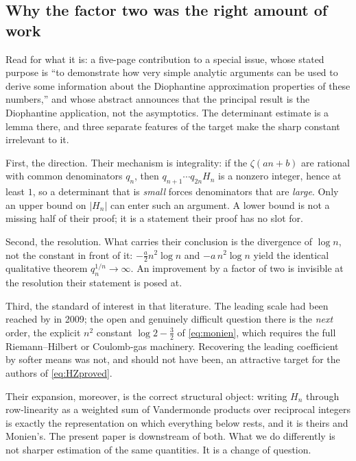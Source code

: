 \documentclass[11pt]{amsart}
\numberwithin{equation}{section}
\theoremstyle{plain}
\theoremstyle{definition}
\theoremstyle{remark}
\begin{document}
\subsection{Why the factor two was the right amount of work}
\label{ss:whytwo}

Read \cite{HaynesZudilin2015} for what it is: a five-page contribution to a special issue, whose
stated purpose is ``to demonstrate how very simple analytic arguments can be used to derive some
information about the Diophantine approximation properties of these numbers,'' and whose abstract
announces that the principal result is the Diophantine application, not the asymptotics. The
determinant estimate is a lemma there, and three separate features of the target make the sharp
constant irrelevant to it.

First, the direction. Their mechanism is integrality: if the $\zeta(an+b)$ are rational with common
denominators $q_{n}$, then $q_{n+1}\cdots q_{2n}H_{n}$ is a nonzero integer, hence at least $1$, so a
determinant that is \emph{small} forces denominators that are \emph{large}. Only an upper bound on
$|H_{n}|$ can enter such an argument. A lower bound is not a missing half of their proof; it is a
statement their proof has no slot for.

Second, the resolution. What carries their conclusion is the divergence of $\log n$, not the
constant in front of it: $-\tfrac a2n^{2}\log n$ and $-a\,n^{2}\log n$ yield the identical
qualitative theorem $q_{n}^{1/n}\to\infty$. An improvement by a factor of two is invisible at the
resolution their statement is posed at.

Third, the standard of interest in that literature. The leading scale had been reached by
\cite{Monien2009} in 2009; the open and genuinely difficult question there is the \emph{next} order,
the explicit $n^{2}$ constant $\log2-\tfrac32$ of \eqref{eq:monien}, which requires the full
Riemann--Hilbert or Coulomb-gas machinery. Recovering the leading coefficient by softer means was
not, and should not have been, an attractive target for the authors of \eqref{eq:HZproved}.

Their expansion, moreover, is the correct structural object: writing $H_{n}$ through row-linearity
as a weighted sum of Vandermonde products over reciprocal integers is exactly the representation on
which everything below rests, and it is theirs and Monien's. The present paper is downstream of both.
What we do differently is not sharper estimation of the same quantities. It is a change of question.
\end{document}
